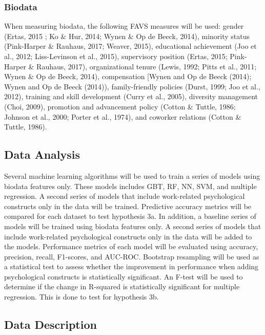 \documentclass[
  man]{apa7}
\begin{document}
\hypertarget{biodata}{%
\subsubsection{Biodata}\label{biodata}}

When measuring biodata, the following FAVS measures will be used: gender (Ertas, 2015 ; Ko \& Hur, 2014; Wynen \& Op de Beeck, 2014), minority status (Pink-Harper \& Rauhaus, 2017; Weaver, 2015), educational achievement (Joo et al., 2012; Liss-Levinson et al., 2015), supervisory position (Ertas, 2015; Pink-Harper \& Rauhaus, 2017), organizational tenure (Lewis, 1992; Pitts et al., 2011; Wynen \& Op de Beeck, 2014),
compensation {[}Wynen and Op de Beeck (2014); Wynen and Op de Beeck (2014)), family-friendly policies (Durst, 1999; Joo et al., 2012), training and skill development (Curry et al., 2005), diversity management (Choi, 2009), promotion and advancement policy (Cotton \& Tuttle, 1986; Johnson et al., 2000; Porter et al., 1974), and coworker relations (Cotton \& Tuttle, 1986).

\hypertarget{data-analysis-1}{%
\subsection{Data Analysis}\label{data-analysis-1}}

Several machine learning algorithms will be used to train a series of models using biodata features only. These models includes GBT, RF, NN, SVM, and multiple regression. A second series of models that include work-related psychological constructs only in the data will be trained. Predictive accuracy metrics will be compared for each dataset to test hypothesis 3a.
In addition, a baseline series of models will be trained using biodata features only. A second series of models that include work-related psychological constructs only in the data will be added to the models. Performance metrics of each model will be evaluated using accuracy, precision, recall, F1-scores, and AUC-ROC. Bootstrap resampling will be used as a statistical test to assess whether the improvement in performance when adding psychological constructs is statistically significant. An F-test will be used to determine if the change in R-squared is statistically significant for multiple regression. This is done to test for hypothesis 3b.

\hypertarget{data-description}{%
\subsection{Data Description}\label{data-description}}
\end{document}
